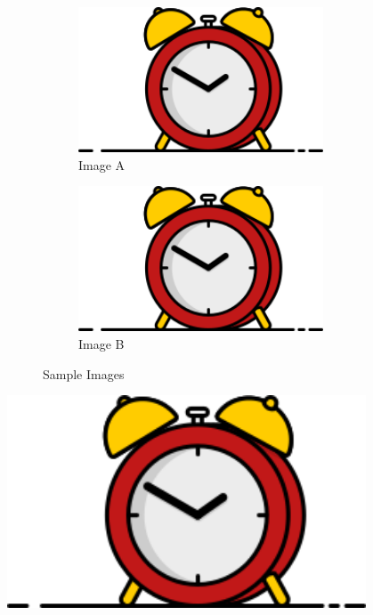\documentclass[twoside]{report}
\numberwithin{equation}{section}		%
\numberwithin{figure}{section}			%
\numberwithin{table}{section}
\begin{document}
    \begin{figure}
        \centering
        \begin{subfigure}[b]{0.45\textwidth}
            \centering
            \includegraphics[width=0.8\textwidth,totalheight=\textheight,keepaspectratio]{front_page_logo.png}
            \caption{Image A}
        \end{subfigure}
        \hfill
        \begin{subfigure}[b]{0.45\textwidth}
            \centering
            \includegraphics[width=0.8\textwidth,totalheight=\textheight,keepaspectratio]{front_page_logo.png}
            \caption{Image B}
        \end{subfigure}
        \caption{Sample Images}
    \end{figure}

    \begin{minipage}{0.95\textwidth}
        \centering
        \captionsetup{type=figure}
        \includegraphics[width=0.8\textwidth,totalheight=\textheight,keepaspectratio]{front_page_logo.png}
    \end{minipage}
\end{document}
